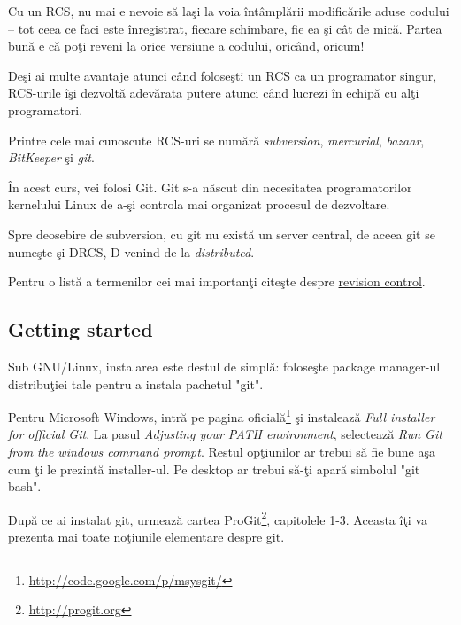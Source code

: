 Cu un RCS, nu mai e nevoie să laşi la voia întâmplării modificările
aduse codului -- tot ceea ce faci este înregistrat, fiecare schimbare,
fie ea şi cât de mică. Partea bună e că poţi reveni la orice versiune
a codului, oricând, oricum!

Deşi ai multe avantaje atunci când foloseşti un RCS ca un programator singur,
RCS-urile îşi dezvoltă adevărata putere atunci când lucrezi în echipă
cu alţi programatori.

Printre cele mai cunoscute RCS-uri se numără \textit{subversion},
\textit{mercurial}, \textit{bazaar}, \textit{BitKeeper} şi \textit{git}.

În acest curs, vei folosi Git. Git s-a născut din necesitatea
programatorilor kernelului Linux de a-şi controla mai organizat
procesul de dezvoltare.

Spre deosebire de subversion, cu git nu există un server central,
de aceea git se numeşte şi DRCS, D venind de la \textsl{distributed}.

Pentru o listă a termenilor cei mai importanţi citeşte despre
\href{http://en.wikipedia.org/wiki/Revision_control}{revision control}.

\subsection{Getting started}
Sub GNU/Linux, instalarea este destul de simplă: foloseşte
package manager-ul distribuţiei tale pentru a instala pachetul "git".

Pentru Microsoft Windows,
intră pe pagina oficială\footnote{\url{http://code.google.com/p/msysgit/}}
şi instalează \textit{Full installer for official Git}. La pasul
\textit{Adjusting your PATH environment}, selectează \textit{Run
Git from the windows command prompt}. Restul opţiunilor ar trebui
să fie bune aşa cum ţi le prezintă installer-ul. Pe desktop ar trebui
să-ţi apară simbolul "git bash".

După ce ai instalat git, urmează cartea ProGit\footnote{\url{http://progit.org}},
capitolele 1-3. Aceasta îţi va prezenta mai toate noţiunile elementare
despre git.

